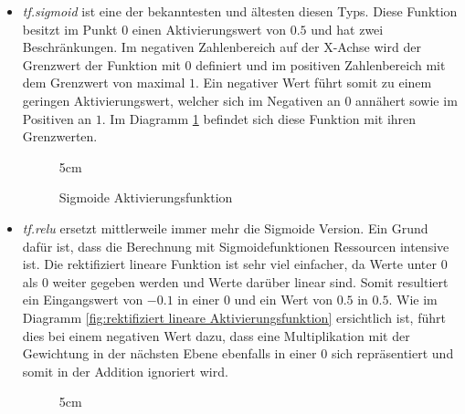 \begin{itemize}
	\item \textit{tf.sigmoid} ist eine der bekanntesten und ältesten diesen Typs.
	Diese Funktion besitzt im Punkt $0$ einen Aktivierungswert von $0.5$ und hat zwei Beschränkungen. 
	Im negativen Zahlenbereich auf der X-Achse wird der Grenzwert der Funktion mit $0$ definiert und im positiven Zahlenbereich mit dem Grenzwert von maximal $1$. 
	Ein negativer Wert führt somit zu einem geringen Aktivierungswert, welcher sich im Negativen an $0$ annähert sowie im Positiven an $1$.
	Im Diagramm \ref{fig:Sigmoide Aktivierungsfunktion} befindet sich diese Funktion mit ihren Grenzwerten. 
\begin{figure}[ht!]
	\centering
	 {5cm} {
	}
	\caption{Sigmoide Aktivierungsfunktion}
	\label{fig:Sigmoide Aktivierungsfunktion}
\end{figure}
	\item \textit{tf.relu} ersetzt mittlerweile immer mehr die Sigmoide Version. 
	Ein Grund dafür ist, dass die Berechnung mit Sigmoidefunktionen Ressourcen intensive ist. 
	Die rektifiziert lineare Funktion ist sehr viel einfacher, da Werte unter $0$ als $0$ weiter gegeben werden und Werte darüber linear sind. 
	Somit resultiert ein Eingangswert von $-0.1$ in einer $0$ und ein Wert von $0.5$ in $0.5$.
	Wie im Diagramm \ref{fig:rektifiziert lineare Aktivierungsfunktion} ersichtlich ist, führt dies bei einem negativen Wert dazu, dass eine Multiplikation mit der Gewichtung in der nächsten Ebene ebenfalls in einer $0$ sich repräsentiert und somit in der Addition ignoriert wird.
\begin{figure}[ht!]
	\centering
	\resizebox {!} {5cm} {
	}
\end{figure}
\end{itemize}
